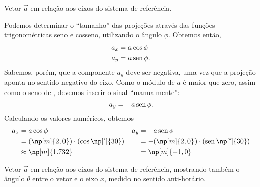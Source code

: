 \begin{marginfigure}
\centering
{}
\caption{Vetor $\vec{a}$ em relação aos eixos do sistema de referência. \label{Fig:Ex:DecompNegativa}}
\end{marginfigure}

Podemos determinar o ``tamanho'' das projeções através das funções trigonométricas seno e cosseno, utilizando o ângulo $\phi$. Obtemos então,
\begin{align}
    a_x &= a\cos\phi \\
    a_y &= a\operatorname{sen}\phi.
\end{align}
%
Sabemos, porém, que a componente $a_y$ deve ser negativa, uma vez que a projeção aponta no sentido negativo do eixo. Como o módulo de $a$ é maior que zero, assim como o seno de , devemos inserir o sinal ``manualmente'':
\begin{equation}
    a_y = -a\operatorname{sen}\phi.
\end{equation}
%
Calculando os valores numéricos, obtemos
\begin{align}
    a_x &= a\cos\phi & a_y &= -a\sen\phi \\
    &= (\np[m]{2,0})\cdot(\cos\np[\tcdegree]{30}) & &= -(\np[m]{2,0})\cdot(\sen\np[\tcdegree]{30}) \\
    &\approx \np[m]{1.732} & &= \np[m]{-1,0}
\end{align}

\begin{marginfigure}
\centering
{}
\caption{Vetor $\vec{a}$ em relação aos eixos do sistema de referência, mostrando também o ângulo $\theta$ entre o vetor e o eixo $x$, medido no sentido anti-horário. \label{Fig:Ex:DecompNegativaAngTheta}}
\end{marginfigure}


